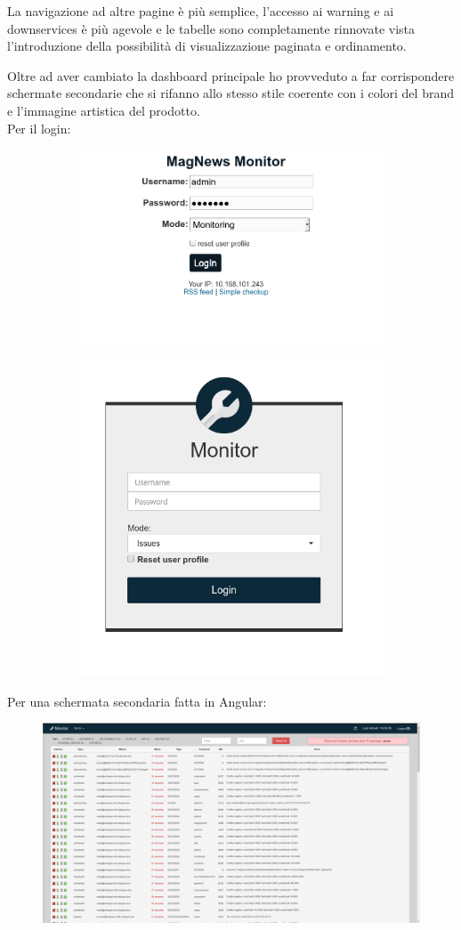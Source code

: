 \documentclass[a4paper]{article}
\begin{document}
La navigazione ad altre pagine è più semplice, l'accesso ai warning e ai downservices
è più agevole e le tabelle sono completamente rinnovate vista l'introduzione della possibilità di
visualizzazione paginata e ordinamento.
\par Oltre ad aver cambiato la dashboard principale ho provveduto a far corrispondere schermate secondarie
che si rifanno allo stesso stile coerente con i colori del brand e l'immagine artistica del prodotto.\\
Per il login:
\begin{figure}[H]
	\centering
	\begin{subfigure}
	  \centering
	  \includegraphics[width=0.45\linewidth]{login_old.png}
	\end{subfigure}%
	\begin{subfigure}
	  \centering
	  \includegraphics[width=0.45\linewidth]{login_new.png}
	\end{subfigure}
\end{figure}
Per una schermata secondaria fatta in Angular:
\begin{figure}[H]
	\includegraphics[width=\textwidth]{issue_new.png}
	\centering
\end{figure}
\end{document}

